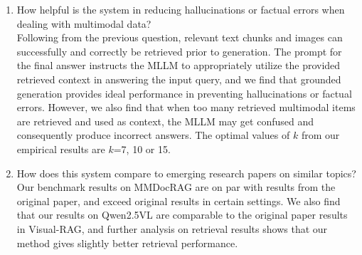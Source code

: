 \begin{enumerate}
    \item How helpful is the system in reducing hallucinations or factual errors when dealing with multimodal data? \\
            Following from the previous question, relevant text chunks and images can successfully and correctly be retrieved prior to generation.
            The prompt for the final answer instructs the MLLM to appropriately utilize the provided retrieved context in answering the input query,
            and we find that grounded generation provides ideal performance in preventing hallucinations or factual errors. 
            However, we also find that when too many retrieved multimodal items are retrieved and used as context,
            the MLLM may get confused and consequently produce incorrect answers.
            The optimal values of $k$ from our empirical results are $k$=7, 10 or 15.

    \newpage
    \item How does this system compare to emerging research papers on similar topics? \\
            Our benchmark results on MMDocRAG are on par with results from the original paper,
            and exceed original results in certain settings.
            We also find that our results on Qwen2.5VL are comparable to the original paper results in Visual-RAG,
            and further analysis on retrieval results shows that our method gives slightly better retrieval performance.
\end{enumerate}